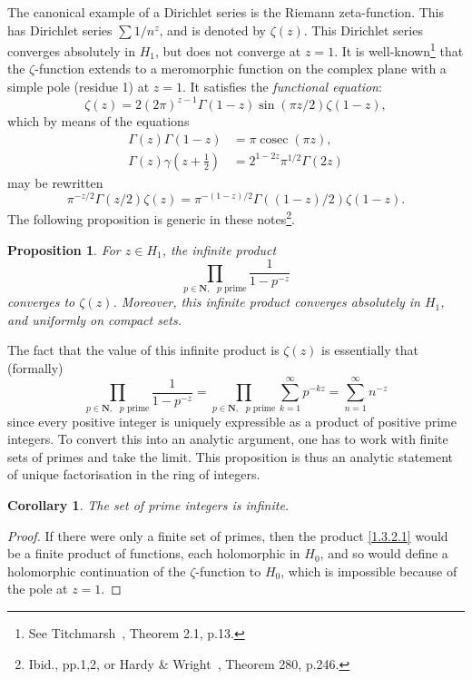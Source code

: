 \documentclass[10pt]{article}
\newtheorem{prop}[theo]{Proposition}
\newtheorem{coro}[theo]{Corollary}
\theoremstyle{definition}
\def\NN{\mathbf{N}}
\def\fnei{See Titchmarsh~\cite{bib:195}, Theorem 2.1, p.13.}
\def\fnni{Ibid., pp.1,2, or Hardy \& Wright~\cite{bib:86}, Theorem 280, p.246.}
\begin{document}
The canonical example of a Dirichlet series is the Riemann zeta-function.
This has Dirichlet series $\sum 1/n^z$, and is denoted by $\zeta(z)$.
This Dirichlet series converges absolutely in $H_1$, but does not converge at $z = 1$.
It is well-known\footnote{\fnei} that the $\zeta$-function extends to a meromorphic function on the complex plane with a simple pole (residue 1) at $z = 1$.
It satisfies the \emph{functional equation}:
\begin{equation}
\label{1.3.1}
\zeta(z) = 2 (2\pi)^{z-1} \Gamma(1-z) \sin(\pi z/2) \zeta(1-z),
\end{equation}
which by means of the equations
\begin{align*}
\Gamma(z) \Gamma(1-z)
&= \pi \operatorname{cosec} (\pi z),
\\
\Gamma(z) \gamma(z + \tfrac 12) 
&= 2^{1-2z} \pi^{1/2} \Gamma(2z)
\end{align*}
may be rewritten
\[
\pi^{-z/2} \Gamma(z/2) \zeta(z)
= \pi^{-(1-z)/2} \Gamma((1-z)/2) \zeta(1-z).
\]
The following proposition is generic in these notes\footnote{\fnni}.


\begin{prop}
\label{1.3.2}
For $z \in H_1$, the infinite product
\begin{equation}
\label{1.3.2.1}
\prod_{p \in \NN,\text{ $p$ prime}}
\frac{1}{1-p^{-z}}
\end{equation}
converges to $\zeta(z)$.
Moreover, this infinite product converges absolutely in $H_1$, and uniformly on compact sets.
\end{prop}

The fact that the value of this infinite product is $\zeta(z)$ is essentially that (formally)
\[
\prod_{p \in \NN,\text{ $p$ prime}}
\frac{1}{1-p^{-z}}
= \prod_{p \in \NN,\text{ $p$ prime}}
\sum_{k=1}^\infty p^{-kz}
= \sum_{n=1}^\infty n^{-z}
\]
since every positive integer is uniquely expressible as a product of positive prime integers.
To convert this into an analytic argument, one has to work with finite sets of primes and take the limit.
This proposition is thus an analytic statement of unique factorisation in the ring of integers.


\begin{coro}
\label{1.3.3}
The set of prime integers is infinite.
\end{coro}

\begin{proof}
If there were only a finite set of primes, then the product \eqref{1.3.2.1} would be a finite product of functions, each holomorphic in $H_0$, and so would define a holomorphic continuation of the $\zeta$-function to $H_0$, which is impossible because of the pole at $z = 1$.
\end{proof}
\end{document}
